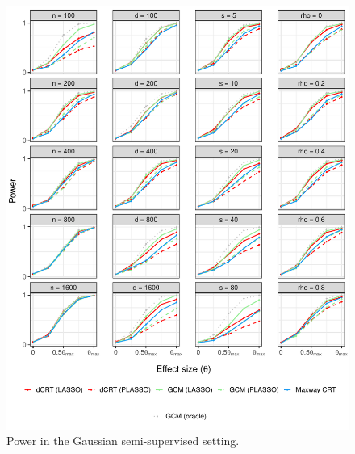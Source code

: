\documentclass[aos]{imsart}
\theoremstyle{definition}
\theoremstyle{remark}
\begin{document}
\begin{figure}[!ht]
	\centering
	\includegraphics[width = \textwidth]{figures/gaussian_semi_supervised_setting_alternative.pdf}
	\caption{Power in the Gaussian semi-supervised setting.}
	\label{fig:gaussian_semi-supervised_alternative}
\end{figure}
\end{document}
